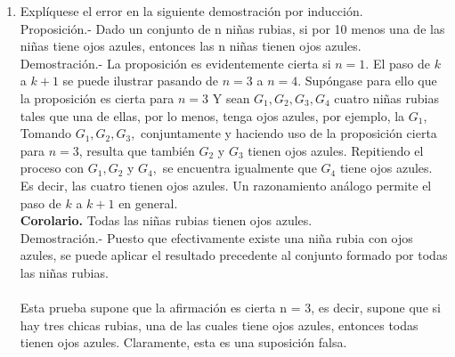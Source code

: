 \begin{enumerate}
\item Explíquese el error en la siguiente demostración por inducción.\\
Proposición.- Dado un conjunto de n niñas rubias, si por 10 menos una de las niñas tiene ojos azules, entonces las n niñas tienen ojos azules.\\
Demostración.-\; La proposición es evidentemente cierta si $n = 1$. El paso de $k$ a $k + 1$ se puede ilustrar pasando de $n = 3$ a $n = 4$. Supóngase para ello que la proposición es cierta para $n=3$ Y sean $G_1, G_2, G_3, G_4$ cuatro niñas rubias tales que una de ellas, por lo menos, tenga ojos azules, por ejemplo, la $G_1$, Tomando $G_1,G_2, G_3,$ conjuntamente y haciendo uso de la proposición cierta para $n =3$, resulta que también $G_2$ y $G_3$ tienen ojos azules. Repitiendo el proceso con $G_1, G_2$ y $G_4,$ se encuentra igualmente que $G_4$ tiene ojos azules. Es decir, las cuatro tienen ojos azules. Un razonamiento análogo permite el paso de $k$ a $k + 1$ en general.\\
\textbf{Corolario.} Todas las niñas rubias tienen ojos azules.\\
Demostración.- \; Puesto que efectivamente existe una niña rubia con ojos azules, se puede aplicar el resultado precedente al conjunto formado por todas las niñas rubias.\\\\
Esta prueba supone que la afirmación es cierta n = 3, es decir, supone que si hay tres chicas rubias, una de las cuales tiene ojos azules, entonces todas tienen ojos azules. Claramente, esta es una suposición falsa.\\\\
\end{enumerate}

\setcounter{section}{6}
